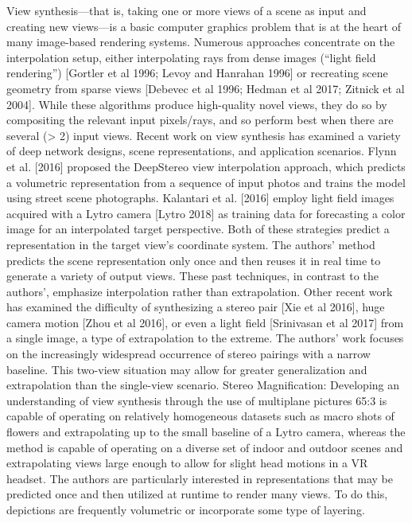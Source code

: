View synthesis—that is, taking one or more views of a scene as input and creating new views—is a basic computer graphics problem that is at the heart of many image-based rendering systems.
Numerous approaches concentrate on the interpolation setup, either interpolating rays from dense images (“light field rendering”) [Gortler et al 1996; Levoy and Hanrahan 1996] or recreating scene geometry from sparse views [Debevec et al 1996; Hedman et al 2017; Zitnick et al 2004].
While these algorithms produce high-quality novel views, they do so by compositing the relevant input pixels/rays, and so perform best when there are several (> 2) input views.
Recent work on view synthesis has examined a variety of deep network designs, scene representations, and application scenarios.
Flynn et al. [2016] proposed the DeepStereo view interpolation approach, which predicts a volumetric representation from a sequence of input photos and trains the model using street scene photographs.
Kalantari et al. [2016] employ light field images acquired with a Lytro camera [Lytro 2018] as training data for forecasting a color image for an interpolated target perspective.
Both of these strategies predict a representation in the target view's coordinate system.
The authors' method predicts the scene representation only once and then reuses it in real time to generate a variety of output views.
These past techniques, in contrast to the authors', emphasize interpolation rather than extrapolation.
Other recent work has examined the difficulty of synthesizing a stereo pair [Xie et al 2016], huge camera motion [Zhou et al 2016], or even a light field [Srinivasan et al 2017] from a single image, a type of extrapolation to the extreme.
The authors' work focuses on the increasingly widespread occurrence of stereo pairings with a narrow baseline.
This two-view situation may allow for greater generalization and extrapolation than the single-view scenario.
Stereo Magnification: Developing an understanding of view synthesis through the use of multiplane pictures 65:3 is capable of operating on relatively homogeneous datasets such as macro shots of flowers and extrapolating up to the small baseline of a Lytro camera, whereas the method is capable of operating on a diverse set of indoor and outdoor scenes and extrapolating views large enough to allow for slight head motions in a VR headset.
The authors are particularly interested in representations that may be predicted once and then utilized at runtime to render many views.
To do this, depictions are frequently volumetric or incorporate some type of layering.
